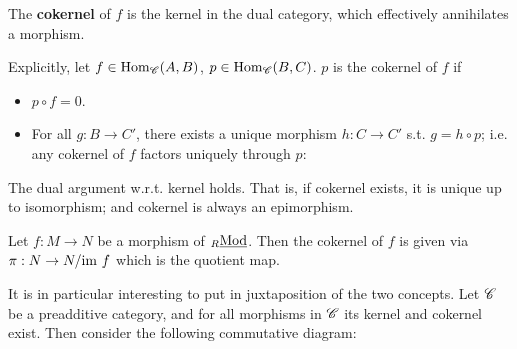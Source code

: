 \begin{definition}[Cokernel]
    The \textbf{cokernel} of $f$ is the kernel in the dual category, which effectively annihilates a morphism.

    Explicitly, let $f \in \mathrm{Hom}_{\mathscr{C}}(A, B)$, $p \in \mathrm{Hom}_{\mathscr{C}}(B, C)$. $p$ is the cokernel of $f$ if
    \begin{itemize}
        \item $p \circ f = 0$.
        \item For all $g: B \to C'$, there exists a unique morphism $h: C \to C'$ s.t. $g = h \circ p$; i.e. any cokernel of $f$ factors uniquely through $p$:
    \end{itemize}
    \begin{figure}[htbp]
        \centering
    \end{figure}
\end{definition}

\begin{remark}
    The dual argument w.r.t. kernel holds. That is, if cokernel exists, it is unique up to isomorphism; and cokernel is always an epimorphism.
\end{remark}

\begin{example}
    Let $f: M \to N$ be a morphism of ${}_{R}\underline{\textup{Mod}}$. Then the cokernel of $f$ is given via $\pi: N \to N/\mathrm{im}\  f$ which is the quotient map.
\end{example}

It is in particular interesting to put in juxtaposition of the two concepts. Let $\mathscr{C}$ be a preadditive category, and for all morphisms in $\mathscr{C}$ its kernel and cokernel exist. Then consider the following commutative diagram:
\begin{figure}[htbp]
    \centering
\end{figure}

